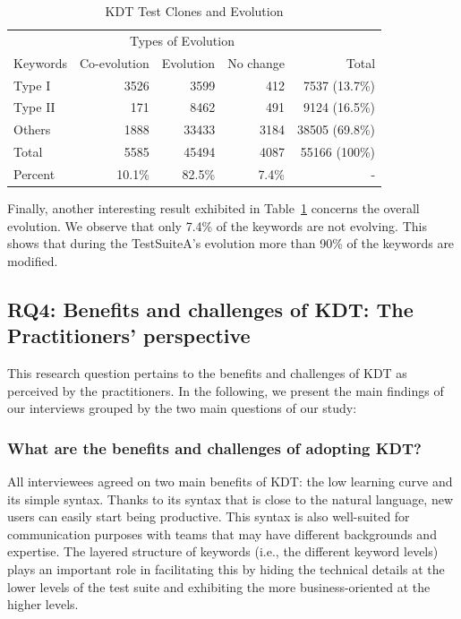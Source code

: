 \begin{table}
\caption{KDT Test Clones and Evolution}
\label{table:co_evolution}
\centering
\begin{tabular}{l|rrr|r}
  \toprule
         & \multicolumn{3}{c|}{Types of Evolution}                  \\
Keywords & Co-evolution &  Evolution &  No change &  Total          \\
\midrule
Type I  &          3526 &       3599 &        412 &   7537 (13.7\%) \\
Type II &           171 &       8462 &        491 &   9124 (16.5\%) \\  
Others  &          1888 &      33433 &       3184 &  38505 (69.8\%) \\
\midrule                                   
Total   &          5585 &      45494 &       4087 &  55166 (100\%)  \\ 
Percent &        10.1\% &     82.5\% &      7.4\% &    -            \\
\bottomrule
\end{tabular}
\end{table}

Finally, another interesting result exhibited in Table~\ref{table:co_evolution} concerns the overall evolution. We observe that only 7.4\% of the keywords are not evolving. This shows that during the TestSuiteA's evolution more than 90\% of the keywords are modified.

\subsection{RQ4: Benefits and challenges of KDT: The Practitioners' perspective}
\label{sec:evolution-results-rq4}

This research question pertains to the benefits and challenges of KDT as perceived by the practitioners. In the following, we present the main findings of our interviews grouped by the two main questions of our study:

\subsubsection{What are the benefits and challenges of adopting KDT?}

All interviewees agreed on two main benefits of KDT: the low learning curve and its simple syntax. Thanks to its syntax that is close to the natural language, new users can easily start being productive.  This syntax is also well-suited for communication purposes with teams that may have different backgrounds and expertise. The layered structure of keywords (i.e., the different keyword levels) plays an important role in facilitating this by hiding the technical details at the lower levels of the test suite and exhibiting the more business-oriented at the higher levels.

